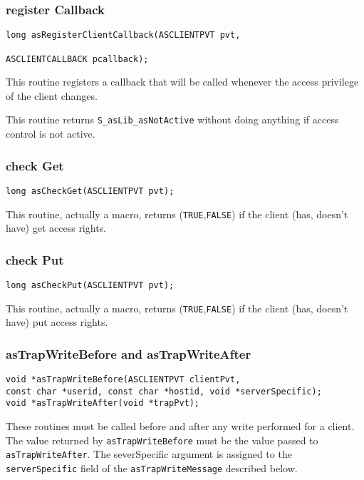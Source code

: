 \subsubsection{register Callback}

\begin{verbatim}long asRegisterClientCallback(ASCLIENTPVT pvt,

ASCLIENTCALLBACK pcallback);
\end{verbatim} This routine registers a callback that will be called whenever the access privilege of the client changes.

This routine returns \verb|S_asLib_asNotActive| without doing anything if access control is not active.

\subsubsection{check Get}

\begin{verbatim}long asCheckGet(ASCLIENTPVT pvt); 
\end{verbatim}This routine, actually a macro, returns (\verb|TRUE|,\verb|FALSE|) if the client (has, doesn't have) get access rights.

\subsubsection{check Put}

\begin{verbatim}long asCheckPut(ASCLIENTPVT pvt);
\end{verbatim}This routine, actually a macro, returns (\verb|TRUE|,\verb|FALSE|) if the client (has, doesn't have) put access rights.

\subsubsection{asTrapWriteBefore and asTrapWriteAfter}

\begin{verbatim}void *asTrapWriteBefore(ASCLIENTPVT clientPvt,
const char *userid, const char *hostid, void *serverSpecific);
void *asTrapWriteAfter(void *trapPvt);
\end{verbatim}These routines must be called before and after any write performed for a client. The value returned by 
\verb|asTrapWriteBefore| must be the value passed to \verb|asTrapWriteAfter|. The severSpecific argument is assigned to 
the \verb|serverSpecific| field of the \verb|asTrapWriteMessage| described below. 

